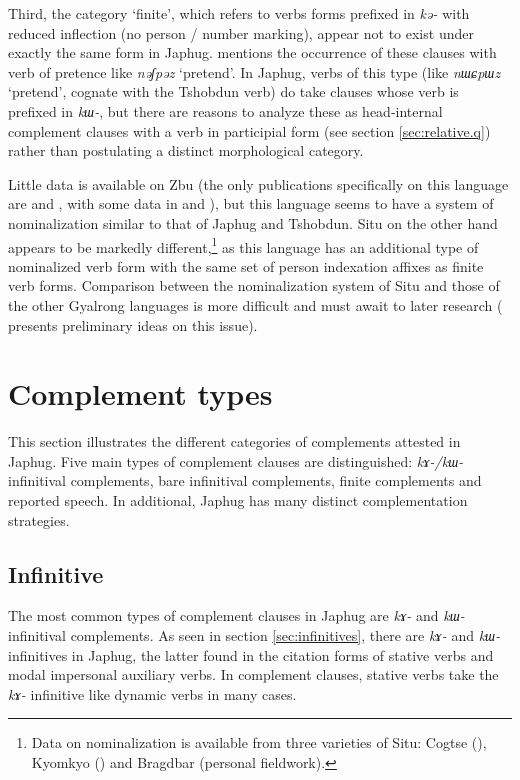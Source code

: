 \documentclass[oneside,a4paper,11pt]{article}
\newcommand{\ipa}[1]{\textit{\phon#1}}
\newcommand{\jpg}[2]{\ipa{#1} `#2'}
\begin{document}
Third, the category `finite', which refers to verbs forms prefixed in \ipa{kə-} with reduced inflection (no person / number marking), appear not to exist under exactly the same form in Japhug. \citet[481]{sun12complementation} mentions the occurrence of these clauses with verb of pretence like \jpg{nəʃpəz}{pretend}. In Japhug, verbs of this type (like \jpg{nɯɕpɯz}{pretend}, cognate with the Tshobdun verb) do take clauses whose verb is prefixed in \ipa{kɯ-}, but there are reasons to analyze these as head-internal complement clauses with a verb in participial form (see section \ref{sec:relative.q}) rather than postulating a distinct morphological category.

Little data is available on Zbu (the only publications specifically on this language are \citealt{jackson04showu} and \citealt{gongxun14agreement}, with some data in \citealt{linxr93jiarongen} and \citealt{jacques08}), but this language seems to have a system of nominalization similar to that of Japhug and Tshobdun. Situ on the other hand appears to be markedly different,\footnote{Data on nominalization is available from three varieties of Situ: Cogtse (\citealt{linxr93jiarongen, wei01ka, jacksonlin07, genetti08nmlz}), Kyomkyo (\citealt{prins11kyomkyo}) and Bragdbar (personal fieldwork).}  as this language has an additional type of nominalized verb form with the same set of person indexation affixes as finite verb forms. Comparison between the nominalization system of Situ and those of the other Gyalrong languages is more difficult and must await to later research (\citealt{jacques17generic} presents preliminary ideas on this issue).

 
\section{Complement types} \label{sec:complement.types}
This section illustrates the different categories of complements attested in Japhug. Five main types of complement clauses are distinguished: \ipa{kɤ-/kɯ-} infinitival complements, bare infinitival complements, finite complements and reported speech. In additional, Japhug has many distinct complementation strategies.

\subsection{Infinitive} \label{sec:infinitives.compl}
The most common types of complement clauses in Japhug are \ipa{kɤ-} and \ipa{kɯ-} infinitival complements. As seen in section \ref{sec:infinitives}, there are \ipa{kɤ-} and \ipa{kɯ-} infinitives in Japhug, the latter found in the citation forms of stative verbs and modal impersonal auxiliary verbs. In complement clauses, stative verbs take the \ipa{kɤ-} infinitive like dynamic verbs in many cases.
\end{document}

